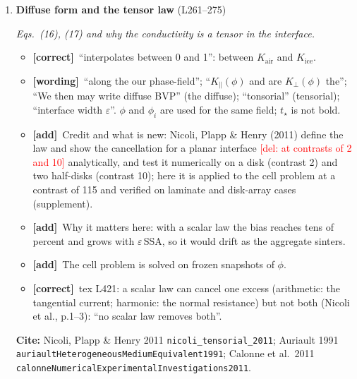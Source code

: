 \documentclass[11pt]{article}
\newcommand{\Cite}[1]{\par{\footnotesize\raggedright\textcolor{have}{\textbf{Cite:}} #1\par}}
\newcommand{\Pg}[3]{\item \textbf{#1} {\small(#2)}\par\textit{#3}}
\newcommand{\tC}{\textcolor{miss}{\textbf{[correct]}}\ }
\newcommand{\tG}{\textcolor{stale}{\textbf{[wording]}}\ }
\newcommand{\tT}{\textcolor{cut}{\textbf{[trim]}}\ }
\newcommand{\tA}{\textcolor{have}{\textbf{[add]}}\ }
\newcommand{\add}[1]{\textcolor{revB}{#1}}
\newcommand{\del}[1]{\textcolor{red}{[del: #1]}}
\begin{document}
\begin{enumerate}
\begin{itemize}
    in Eq.~(15).
  \item \tG ``as diffuse interface model'' (as a); ``in 2.1'' (Section~2.1);
    ``We can the define'' (then); ``$\zeta = 1.0$'' (1).
  \item \tT Eqs.~(12)--(14) can be one sentence: summing the weak forms over
    the two subdomains, the interface terms cancel by flux continuity, and
    Eq.~(15) follows.
  \end{itemize}
\Pg{Diffuse form and the tensor law}{L261--275}{Eqs.~(16), (17) and why the conductivity is a tensor in the interface.}
  \begin{itemize}
  \item \tC ``interpolates between 0 and 1'': between $K_{\mathrm{air}}$ and
    $K_{\mathrm{ice}}$.
  \item \tG ``along the our phase-field''; ``$K_\parallel(\phi)$ and are
    $K_\perp(\phi)$ the''; ``We then may write diffuse BVP'' (the diffuse);
    ``tonsorial'' (tensorial); ``interface width $\varepsilon$''. $\phi$
    and $\phi_i$ are used for the same field; $t_\star$ is not bold.
  \item \tA Credit and what is new: Nicoli, Plapp \& Henry (2011) define the
    law and show the cancellation for a planar interface \del{at contrasts of 2
    and 10} \add{analytically, and test it numerically on a disk (contrast 2) and two half-disks (contrast 10)}; here it is applied to the cell problem at a contrast of 115
    and verified on laminate and disk-array cases (supplement).
  \item \tA Why it matters here: with a scalar law the bias reaches tens of
    percent and grows with $\varepsilon\,$SSA, so it would drift as the
    aggregate sinters.
  \item \tA The cell problem is solved on frozen snapshots of $\phi$.
  \item \add{\tC tex L421: a scalar law can cancel one excess (arithmetic: the tangential current; harmonic: the normal
    resistance) but not both (Nicoli et al., p.1--3): ``no scalar law removes both''.}
  \end{itemize}
  \Cite{Nicoli, Plapp \& Henry 2011 \texttt{nicoli\_tensorial\_2011}; Auriault 1991 \texttt{auriaultHeterogeneousMediumEquivalent1991}; Calonne et al.\ 2011 \texttt{calonneNumericalExperimentalInvestigations2011}.}

\end{enumerate}
\end{document}

